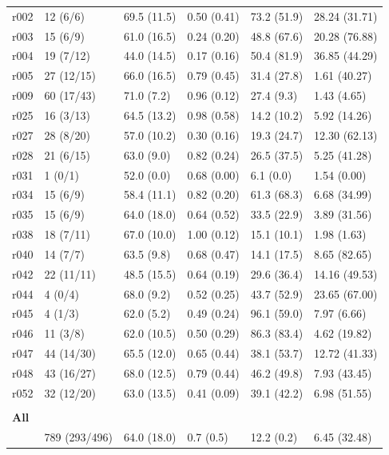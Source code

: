 \documentclass[10pt]{article}
\begin{document}
\begin{table}[h]
\begin{tabular}{llllll}
r002 & 12 (6/6) & 69.5 (11.5) & 0.50 (0.41) & 73.2 (51.9) & 28.24 (31.71) \\
r003 & 15 (6/9) & 61.0 (16.5) & 0.24 (0.20) & 48.8 (67.6) & 20.28 (76.88) \\
r004 & 19 (7/12) & 44.0 (14.5) & 0.17 (0.16) & 50.4 (81.9) & 36.85 (44.29) \\
r005 & 27 (12/15) & 66.0 (16.5) & 0.79 (0.45) & 31.4 (27.8) & 1.61 (40.27) \\
r009 & 60 (17/43) & 71.0 (7.2) & 0.96 (0.12) & 27.4 (9.3) & 1.43 (4.65) \\
r025 & 16 (3/13) & 64.5 (13.2) & 0.98 (0.58) & 14.2 (10.2) & 5.92 (14.26) \\
r027 & 28 (8/20) & 57.0 (10.2) & 0.30 (0.16) & 19.3 (24.7) & 12.30 (62.13) \\
r028 & 21 (6/15) & 63.0 (9.0) & 0.82 (0.24) & 26.5 (37.5) & 5.25 (41.28) \\
r031 & 1 (0/1) & 52.0 (0.0) & 0.68 (0.00) & 6.1 (0.0) & 1.54 (0.00) \\
r034 & 15 (6/9) & 58.4 (11.1) & 0.82 (0.20) & 61.3 (68.3) & 6.68 (34.99) \\
r035 & 15 (6/9) & 64.0 (18.0) & 0.64 (0.52) & 33.5 (22.9) & 3.89 (31.56) \\
r038 & 18 (7/11) & 67.0 (10.0) & 1.00 (0.12) & 15.1 (10.1) & 1.98 (1.63) \\
r040 & 14 (7/7) & 63.5 (9.8) & 0.68 (0.47) & 14.1 (17.5) & 8.65 (82.65) \\
r042 & 22 (11/11) & 48.5 (15.5) & 0.64 (0.19) & 29.6 (36.4) & 14.16 (49.53) \\
r044 & 4 (0/4) & 68.0 (9.2) & 0.52 (0.25) & 43.7 (52.9) & 23.65 (67.00) \\
r045 & 4 (1/3) & 62.0 (5.2) & 0.49 (0.24) & 96.1 (59.0) & 7.97 (6.66) \\
r046 & 11 (3/8) & 62.0 (10.5) & 0.50 (0.29) & 86.3 (83.4) & 4.62 (19.82) \\
r047 & 44 (14/30) & 65.5 (12.0) & 0.65 (0.44) & 38.1 (53.7) & 12.72 (41.33) \\
r048 & 43 (16/27) & 68.0 (12.5) & 0.79 (0.44) & 46.2 (49.8) & 7.93 (43.45) \\
r052 & 32 (12/20) & 63.0 (13.5) & 0.41 (0.09) & 39.1 (42.2) & 6.98 (51.55) \\
 & & & & &\\
\textbf{All}  & & & & &\\
\midrule
& 789 (293/496) & 64.0 (18.0) & 0.7 (0.5) & 12.2 (0.2) & 6.45 (32.48) \\
\bottomrule
\end{tabular}
\end{table}
\end{document}
